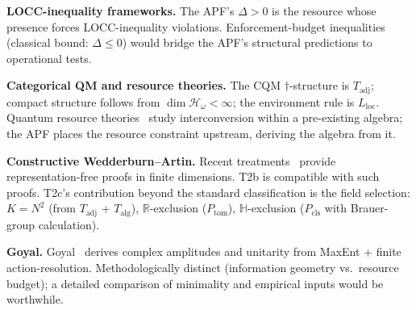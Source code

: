 \documentclass[11pt]{article}
\theoremstyle{remark}
\begin{document}
\smallskip\noindent\textbf{LOCC-inequality frameworks.}  The APF's $\Delta > 0$ is the resource whose presence forces LOCC-inequality violations.  Enforcement-budget inequalities (classical bound: $\Delta \le 0$) would bridge the APF's structural predictions to operational tests.

\smallskip\noindent\textbf{Categorical QM and resource theories.}  The CQM $\dagger$-structure is $T_{\mathrm{adj}}$; compact structure follows from $\dim \mathcal{H}_\omega < \infty$; the environment rule is $L_{\mathrm{loc}}$.  Quantum resource theories~\cite{ChitambarGour2019,CoeckeFritzSpekkens2016} study interconversion within a pre-existing algebra; the APF places the resource constraint upstream, deriving the algebra from it.

\smallskip\noindent\textbf{Constructive Wedderburn--Artin.}  Recent treatments~\cite{GR2507} provide representation-free proofs in finite dimensions.  T2b is compatible with such proofs.  T2c's contribution beyond the standard classification is the field selection: $K = N^2$ (from $T_{\mathrm{adj}}$ + $T_{\mathrm{alg}}$), $\mathbb{R}$-exclusion ($P_{\mathrm{tom}}$), $\mathbb{H}$-exclusion ($P_{\mathrm{cls}}$ with Brauer-group calculation).

\smallskip\noindent\textbf{Goyal.}  Goyal~\cite{Goyal2025} derives complex amplitudes and unitarity from MaxEnt + finite action-resolution.  Methodologically distinct (information geometry vs.\ resource budget); a detailed comparison of minimality and empirical inputs would be worthwhile.
\end{document}
